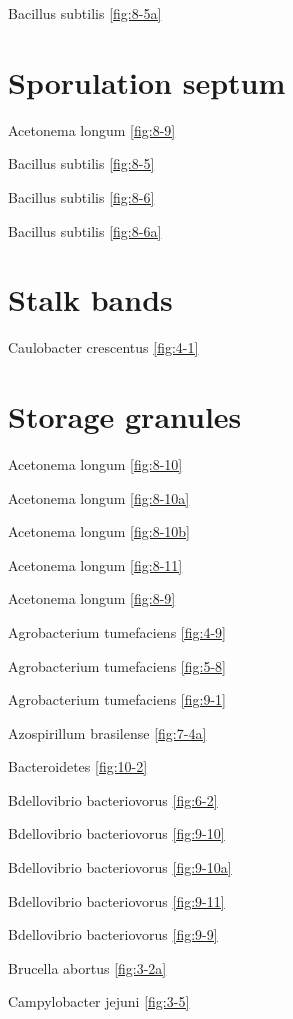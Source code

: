 \documentclass[]{tufte-book}
\begin{document}
Bacillus subtilis \ref{fig:8-5a}

\section*{Sporulation septum}\label{sporulation-septum}

Acetonema longum \ref{fig:8-9}

Bacillus subtilis \ref{fig:8-5}

Bacillus subtilis \ref{fig:8-6}

Bacillus subtilis \ref{fig:8-6a}

\section*{Stalk bands}\label{stalk-bands}

Caulobacter crescentus \ref{fig:4-1}

\section*{Storage granules}\label{storage-granules}

Acetonema longum \ref{fig:8-10}

Acetonema longum \ref{fig:8-10a}

Acetonema longum \ref{fig:8-10b}

Acetonema longum \ref{fig:8-11}

Acetonema longum \ref{fig:8-9}

Agrobacterium tumefaciens \ref{fig:4-9}

Agrobacterium tumefaciens \ref{fig:5-8}

Agrobacterium tumefaciens \ref{fig:9-1}

Azospirillum brasilense \ref{fig:7-4a}

Bacteroidetes \ref{fig:10-2}

Bdellovibrio bacteriovorus \ref{fig:6-2}

Bdellovibrio bacteriovorus \ref{fig:9-10}

Bdellovibrio bacteriovorus \ref{fig:9-10a}

Bdellovibrio bacteriovorus \ref{fig:9-11}

Bdellovibrio bacteriovorus \ref{fig:9-9}

Brucella abortus \ref{fig:3-2a}

Campylobacter jejuni \ref{fig:3-5}
\end{document}
